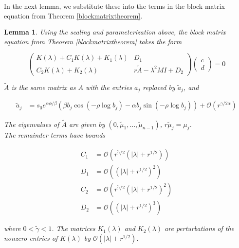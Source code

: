 \documentclass[12pt]{article}
\newtheorem{lemma}{Lemma}
\begin{document}
In the next lemma, we substitute these into the terms in the block matrix equation from Theorem \ref{blockmatrixtheorem}.


\begin{lemma}\label{reparam}
Using the scaling and parameterization above, the block matrix equation from Theorem \ref{blockmatrixtheorem} takes the form

\begin{equation}\label{blockeq}
\begin{pmatrix}
K(\lambda) + C_1 K(\lambda) + K_1(\lambda) & D_1 \\
C_2 K(\lambda) + K_2(\lambda) & r \tilde{A} - \lambda^2 MI + D_2
\end{pmatrix}
\begin{pmatrix}c \\ d \end{pmatrix} 
= 0
\end{equation}

$\tilde{A}$ is the same matrix as $A$ with the entries $a_j$ replaced by $\tilde{a}_j$, and 

\begin{align}\label{tildea}
\tilde{a}_j 
&= s_0 e^{\alpha \phi/\beta} \left( \beta b_j \cos\left( -\rho \log b_j \right) - \alpha b_j \sin \left( -\rho \log b_j  \right) \right) + \mathcal{O}(r^{\gamma/2\alpha})
\end{align}

The eigenvalues of $\tilde{A}$ are given by $(0, \tilde{\mu}_1, \dots, \tilde{\mu}_{n-1})$, $r \tilde{\mu}_j = \mu_j$.\\

The remainder terms have bounds

\begin{align*}
C_1 &= \mathcal{O}\left(r^{\tilde{\gamma}/2}(|\lambda| + r^{1/2})\right) \\
D_1 &= \mathcal{O}\left((|\lambda| + r^{1/2})^2\right) \\
C_2 &= \mathcal{O}\left(r^{\tilde{\gamma}/2}(|\lambda| + r^{1/2})^2\right) \\
D_2 &= \mathcal{O}\left((|\lambda| + r^{1/2})^3\right)
\end{align*}

where $0 < \tilde{\gamma} < 1$. The matrices $K_1(\lambda)$ and $K_2(\lambda)$ are perturbations of the nonzero entries of $K(\lambda)$ by $\mathcal{O}(|\lambda| + r^{1/2})$.\\


\end{lemma}
\end{document}
